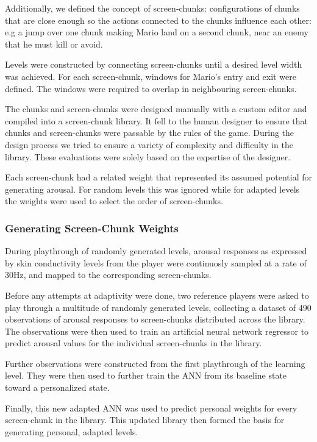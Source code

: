 \documentclass{llncs}
\begin{document}
Additionally, we defined the concept of screen-chunks: configurations of chunks that are close enough so the actions connected to the chunks influence each other: e.g a jump over one chunk making Mario land on a second chunk, near an enemy that he must kill or avoid.

Levels were constructed by connecting screen-chunks until a desired level width was achieved. For each screen-chunk, windows for Mario's entry and exit were defined. The windows were required to overlap in neighbouring screen-chunks.

The chunks and screen-chunks were designed manually with a custom editor and compiled into a screen-chunk library.
It fell to the human designer to ensure that chunks and screen-chunks were passable by the rules of the game.
During the design process we tried to ensure a variety of complexity and difficulty in the library. These evaluations were solely based on the expertise of the designer.

Each screen-chunk had a related weight that represented its assumed potential for generating arousal. For random levels this was ignored while for adapted levels the weights were used to select the order of screen-chunks.

\subsubsection{Generating Screen-Chunk Weights}
During playthrough of randomly generated levels, arousal responses as expressed by skin conductivity levels from the player were continuosly sampled at a rate of 30Hz, and mapped to the corresponding screen-chunks.

Before any attempts at adaptivity were done, two reference players were asked to play through a multitude of randomly generated levels, collecting a dataset of 490 observations of arousal responses to screen-chunks distributed across the library.%
The observations were then used to train an artificial neural network regressor to predict arousal values for the individual screen-chunks in the library.

Further observations were constructed from the first playthrough of the learning level. They were then used to further train the ANN from its baseline state toward a personalized state.

Finally, this new adapted ANN was used to predict personal weights for every screen-chunk in the library. This updated library then formed the basis for generating personal, adapted levels.
\end{document}
